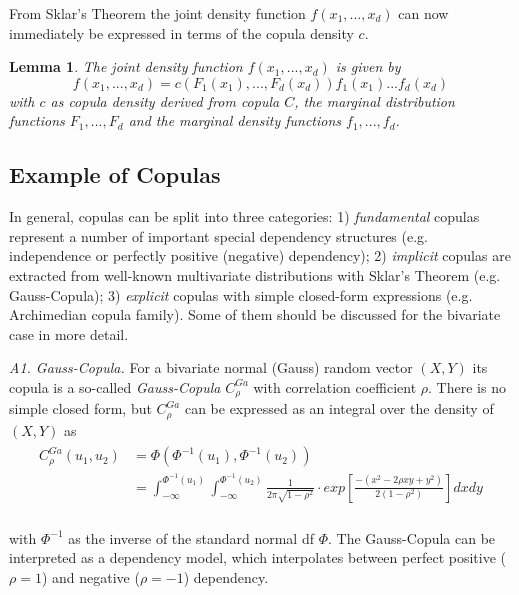 \documentclass[a4paper]{article}
\begin{document}
From Sklar's Theorem the joint density function $f(x_1,...,x_d)$ can now immediately be expressed in terms of the copula density $c$.

\newtheorem{lemma}{Lemma}
\begin{lemma}
	The joint density function $f(x_1,...,x_d)$ is given by
	\begin{equation}
		f(x_1,...,x_d)=c(F_1(x_1),...,F_d(x_d))f_1(x_1)...f_d(x_d)
	\end{equation}
    with $c$ as copula density derived from copula $C$, the marginal distribution functions $F_1,...,F_d$ and the marginal density functions $f_1,...,f_d$.
\end{lemma}

\subsection{Example of Copulas}
In general, copulas can be split into three categories: 1) {\it fundamental} copulas represent a number of important special dependency structures (e.g. independence or perfectly positive (negative) dependency); 2) {\it implicit} copulas are extracted from well-known multivariate distributions with Sklar's Theorem (e.g. Gauss-Copula); 3) {\it explicit} copulas with simple closed-form expressions (e.g. Archimedian copula family). Some of them should be discussed for the bivariate case in more detail.

{\it A1. Gauss-Copula.} For a bivariate normal (Gauss) random vector $(X,Y)$ its copula is a so-called {\it Gauss-Copula} $C_\rho^{Ga}$ with correlation coefficient $\rho$. There is no simple closed form, but $C_\rho^{Ga}$ can be expressed as an integral over the density of $(X,Y)$ as
\begin{align}
	\begin{split}
		C_\rho^{Ga}(u_1,u_2)&=\Phi\left(\Phi^{-1}(u_1),\Phi^{-1}(u_2)\right) \\
		&=\int_{-\infty}^{\Phi^{-1}(u_1)}\int_{-\infty}^{\Phi^{-1}(u_2)} \frac{1}{2\pi \sqrt{1-\rho^2}} \cdot exp \left[\frac{-(x^2-2\rho x y+y^2)}{2(1-\rho^2)} \right] dx dy \\
	\end{split}
\end{align}

with $\Phi^{-1}$ as the inverse of the standard normal df $\Phi$. The Gauss-Copula can be interpreted as a dependency model, which interpolates between perfect positive ($\rho=1$) and negative ($\rho=-1$) dependency.
\end{document}
